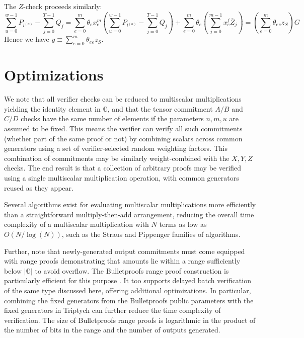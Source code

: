 \documentclass[draft]{article} %
\newcommand{\G}{\mathbb{G}}
\newcommand{\sumj}{\sum_{j=0}^{m-1}}
\newcommand{\sumu}{\sum_{u=0}^{w-1}}
\begin{document}
The $Z$-check proceeds similarly:
$$\sumu P_{l^{(u)}} - \sum_{j=0}^{T-1} Q_j = \sum_{e=0}^m \theta_ex_e^m \left( \sumu P_{l^{(u)}} - \sum_{j=0}^{T-1} Q_j \right) + \sum_{e=0}^m \theta_e \left( \sumj x_e^j \overline{Z}_j \right) = \left( \sum_{e=0}^m \theta_e {}_ez_S  \right)G$$
Hence we have $y \equiv \sum_{e=0}^m \theta_e {}_ez_S$.


\section{Optimizations}
We note that all verifier checks can be reduced to multiscalar multiplications yielding the identity element in $\G$, and that the tensor commitment $A/B$ and $C/D$ checks have the same number of elements if the parameters $n,m,u$ are assumed to be fixed.
This means the verifier can verify all such commitments (whether part of the same proof or not) by combining scalars across common generators using a set of verifier-selected random weighting factors.
This combination of commitments may be similarly weight-combined with the $X,Y,Z$ checks.
The end result is that a collection of arbitrary proofs may be verified using a single multiscalar multiplication operation, with common generators reused as they appear.

Several algorithms exist for evaluating multiscalar multiplications more efficiently than a straightforward multiply-then-add arrangement, reducing the overall time complexity of a multiscalar multiplication with $N$ terms as low as $O(N/\log(N))$, such as the Straus \cite{straus} and Pippenger \cite{pippenger} families of algorithms.

Further, note that newly-generated output commitments must come equipped with range proofs demonstrating that amounts lie within a range sufficiently below $|\G|$ to avoid overflow.
The Bulletproofs range proof construction is particularly efficient for this purpose \cite{bulletproofs}.
It too supports delayed batch verification of the same type discussed here, offering additional optimizations.
In particular, combining the fixed generators from the Bulletproofs public parameters with the fixed generators in Triptych can further reduce the time complexity of verification.
The size of Bulletproofs range proofs is logarithmic in the product of the number of bits in the range and the number of outputs generated.




\end{document}
